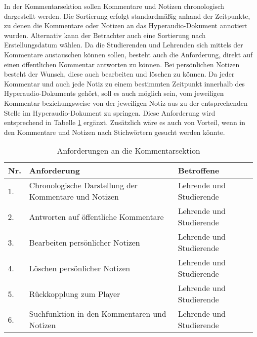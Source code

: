 In der Kommentarsektion sollen Kommentare und Notizen chronologisch dargestellt werden.
Die Sortierung erfolgt standardmäßig anhand der Zeitpunkte, zu denen die Kommentare oder Notizen an das Hyperaudio-Dokument annotiert wurden. Alternativ kann der Betrachter auch eine Sortierung nach Erstellungsdatum wählen. 
Da die Studierenden und Lehrenden sich mittels der Kommentare austauschen können sollen, besteht auch die Anforderung, direkt auf einen öffentlichen Kommentar antworten zu können. Bei persönlichen Notizen besteht der Wunsch, diese auch bearbeiten und löschen zu können. Da jeder Kommentar und auch jede Notiz zu einem bestimmten Zeitpunkt innerhalb des Hyperaudio-Dokuments gehört, soll es auch möglich sein, vom jeweiligen Kommentar beziehungsweise von der jeweiligen Notiz aus zu der entsprechenden Stelle im Hyperaudio-Dokument zu springen. Diese Anforderung wird entsprechend in Tabelle \ref{tab:AnforderungenKommentarsektion} ergänzt. Zusätzlich wäre es auch von Vorteil, wenn in den Kommentare und Notizen nach Stichwörtern gesucht werden könnte.

\begin{table}[!ht]
\def\arraystretch{1.4}
\caption{Anforderungen an die Kommentarsektion}
\label{tab:AnforderungenKommentarsektion}
 \begin{tabularx}{\textwidth}{lXl}      
    \hline
    Nr. & Anforderung & Betroffene 
    \\\hline
    1. & Chronologische Darstellung der Kommentare und Notizen & Lehrende und Studierende\\
    2. & Antworten auf öffentliche Kommentare & Lehrende und Studierende\\
    3. & Bearbeiten persönlicher Notizen & Lehrende und Studierende\\
    4. & Löschen persönlicher Notizen & Lehrende und Studierende\\
    5. & Rückkopplung zum Player & Lehrende und Studierende\\
    6. & Suchfunktion in den Kommentaren und Notizen & Lehrende und Studierende\\
    \hline
    \end{tabularx}
\end{table}

